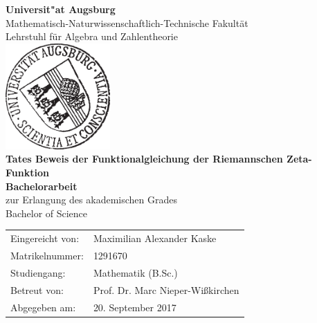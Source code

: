 \begin{titlepage}
    \begin{center}
		\Large
        \textbf{Universit"at Augsburg}\\
		Mathematisch-Naturwissenschaftlich-Technische Fakultät\\
		Lehrstuhl für Algebra und Zahlentheorie\\
        \vspace{2cm}
		\includegraphics[width=0.3\textwidth]{siegel}\\
        \vspace{2cm}
		\LARGE
		\textbf{Tates Beweis der Funktionalgleichung der Riemannschen Zeta-Funktion}\\
        \vspace{2cm}
		\Large
        \textbf{Bachelorarbeit}\\[.15cm]
		\large
		zur Erlangung des akademischen Grades\\[.15cm]
		Bachelor of Science\\
		\vspace{3cm}
		\normalfont
		\normalsize
		\begin{tabular}{l l}
		
			Eingereicht von: & Maximilian Alexander Kaske \\ 
		
			Matrikelnummer: & 1291670 \\ 
		
			Studiengang: & Mathematik (B.Sc.) \\ 
		
			Betreut von:&  Prof. Dr. Marc Nieper-Wißkirchen\\ 
			
			Abgegeben am: & 20. September 2017\\ 
		
		\end{tabular} \\
    \end{center}
\end{titlepage}